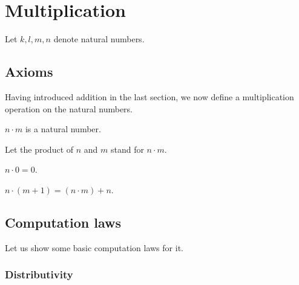 \documentclass[../../arithmetic.tex]{subfiles}
\begin{document}
  \section{Multiplication}

  \begin{forthel}
  \end{forthel}

  \begin{forthel}
    Let $k, l, m, n$ denote natural numbers.
  \end{forthel}


  \subsection{Axioms}

  Having introduced addition in the last section, we now define a multiplication
  operation on the natural numbers.

  \begin{forthel}
    \begin{signature}
      $n \cdot m$ is a natural number.
    \end{signature}

    Let the product of $n$ and $m$ stand for $n \cdot m$.

    \begin{axiom}\label{Arithmetic_01_03_374176}
      $n \cdot 0 = 0$.
    \end{axiom}

    \begin{axiom}\label{Arithmetic_01_03_667207}
      $n \cdot (m + 1) = (n \cdot m) + n$.
    \end{axiom}
  \end{forthel}


  \subsection{Computation laws}

  Let us show some basic computation laws for it.


  \subsubsection*{Distributivity}
\end{document}
